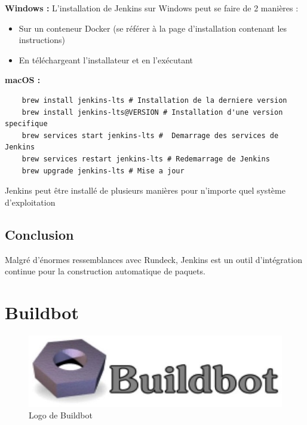 \documentclass[12pt]{article}
\begin{document}
\vspace{0.5cm}

\textbf{Windows :}
L'installation de Jenkins sur Windows peut se faire de 2 manières :
\begin{itemize}
    \item Sur un conteneur Docker (se référer à la page d'installation contenant les instructions)
    \item En téléchargeant l'installateur et en l'exécutant
\end{itemize}

\vspace{0.5cm}

\textbf{macOS :}
\begin{lstlisting}
    brew install jenkins-lts # Installation de la derniere version
    brew install jenkins-lts@VERSION # Installation d'une version specifique
    brew services start jenkins-lts #  Demarrage des services de Jenkins
    brew services restart jenkins-lts # Redemarrage de Jenkins
    brew upgrade jenkins-lts # Mise a jour
\end{lstlisting}

Jenkins peut être installé de plusieurs manières pour n'importe quel système d'exploitation
\subsection{Conclusion}
Malgré d'énormes ressemblances avec Rundeck, Jenkins est un outil d'intégration continue pour la construction automatique de paquets.

\section{Buildbot}

\begin{figure}[ht]
    \includegraphics[scale=0.6]{images/buildbot.jpg}
    \caption{Logo de Buildbot}
\end{figure}
\end{document}
